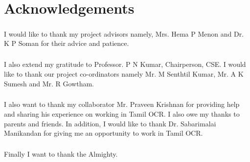 

\chapter*{Acknowledgements}

\paragraph{}
I would like to thank my project advisors namely, Mrs. Hema P Menon and 
Dr. K P Soman for their advice and patience.
\paragraph{}
I also extend my gratitude to Professor. P N Kumar, Chairperson, CSE. 
I would like to thank our project co-ordinators namely Mr. M Senthtil Kumar, Mr. A K Sumesh and 
Mr. R Gowtham.
\paragraph{}
I also want to thank my collaborator Mr. Praveen Krishnan for providing help and sharing his experience on working in Tamil OCR. I also owe my thanks to parents and friends. In addition, I would like to thank Dr. Sabarimalai Manikandan for giving me an opportunity to work in Tamil OCR.
\paragraph{}
Finally I want to thank the Almighty.